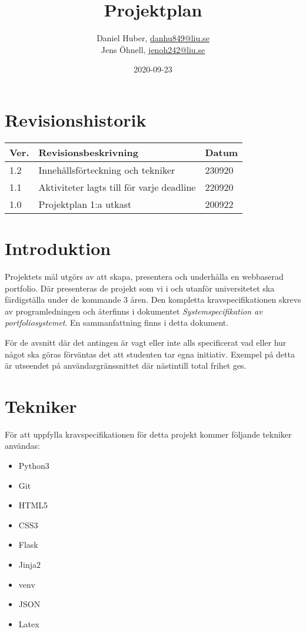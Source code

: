\documentclass{TDP003mall}
\author{Daniel Huber, \url{danhu849@liu.se}\\
  Jens Öhnell, \url{jenoh242@liu.se}}
\title{Projektplan}
\date{2020-09-23}
\begin{document}
\projectpage

\tableofcontents
\newpage



\section{Revisionshistorik}
\begin{table}[!h]
\begin{tabularx}{\linewidth}{|l|X|l|}
\hline
Ver. & Revisionsbeskrivning & Datum \\\hline
1.2 & Innehållsförteckning och tekniker & 230920\\\hline
1.1 & Aktiviteter lagts till för varje deadline & 220920\\\hline
1.0 & Projektplan 1:a utkast & 200922 \\\hline
\end{tabularx}
\end{table}


\section{Introduktion}
Projektets mål utgörs av att skapa, presentera och underhålla en webbaserad portfolio. Där presenteras de projekt som vi i och utanför universitetet ska färdigställa under de kommande 3 åren. Den kompletta kravspecifikationen skrevs av programledningen och återfinns i dokumentet \textit{Systemspecifikation av portfoliosystemet}. En sammanfattning finns i detta dokument.

För de avsnitt där det antingen är vagt eller inte alls specificerat vad eller hur något ska göras förväntas det att studenten tar egna initiativ. Exempel på detta är utseendet på användargränssnittet där nästintill total frihet ges.

\section{Tekniker}
För att uppfylla kravspecifikationen för detta projekt kommer följande tekniker användas:
\begin{itemize}
\item Python3
\item Git
\item HTML5
\item CSS3
\item Flask
\item Jinja2
\item venv
\item JSON
\item Latex
\end{itemize}
\end{document}

